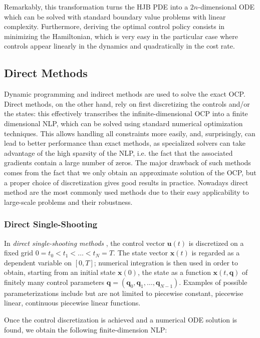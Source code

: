 Remarkably, this transformation turns the HJB PDE into a
$2n$-dimensional ODE which can be solved with standard boundary value
problems with linear complexity. Furthermore, deriving the optimal
control policy consists in minimizing the Hamiltonian, which is very
easy in the particular case where controls appear linearly in the
dynamics and quadratically in the cost rate.

\subsection{Direct Methods}
\label{subsec:chap3-direct-methods}

Dynamic programming and indirect methods are used to solve the exact
OCP. Direct methods, on the other hand, rely on first discretizing the
controls and/or the states: this effectively transcribes the
infinite-dimensional OCP into a finite dimensional NLP, which can be
solved using standard numerical optimization techniques. This allows
handling all constraints more easily, and, surprisingly, can lead to
better performance than exact methods, as specialized solvers can take
advantage of the high sparsity of the NLP, i.e. the fact that the
associated gradients contain a large number of zeros. The major
drawback of such methods comes from the fact that we only obtain an
approximate solution of the OCP, but a proper choice of discretization
gives good results in practice. Nowadays direct method are the most
commonly used methods due to their easy applicability to large-scale
problems and their robustness.

\subsubsection{Direct Single-Shooting}

In \emph{direct single-shooting methods}
\cite{hicks1971approximation,sargent1978development}, the control
vector $\mathbf{u}(t)$ is discretized on a fixed grid
$0=t_0<t_1<\ldots<t_N=T$. The state vector $\mathbf{x}(t)$ is regarded
as a dependent variable on $[0,T]$; numerical integration is then used
in order to obtain, starting from an initial state $\mathbf{x}(0)$,
the state as a function $\mathbf{x}(t,\mathbf{q})$ of finitely many
control parameters
$\mathbf{q}=(\mathbf{q}_0,\mathbf{q}_1,\ldots,\mathbf{q}_{N-1})$. Examples
of possible parameterizations include but are not limited to piecewise
constant, piecewise linear, continuous piecewise linear functions.

Once the control discretization is achieved and a numerical ODE
solution is found, we obtain the following finite-dimension NLP:


